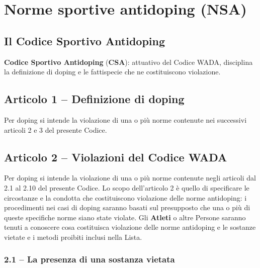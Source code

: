 \chapter{Norme sportive antidoping (NSA)}

\section{Il Codice Sportivo Antidoping}

\textbf{Codice Sportivo Antidoping} (\textbf{CSA}): attuativo del Codice WADA, disciplina la
definizione di doping e le fattispecie che ne costituiscono violazione.

\section{Articolo 1 -- Definizione di doping}

Per doping si intende la violazione di una o più norme contenute nei successivi articoli 2 e 3
del presente Codice.

\section{Articolo 2 -- Violazioni del Codice WADA}

Per doping si intende la violazione di una o più norme contenute negli articoli dal 2.1 al 2.10
del presente Codice. Lo scopo dell'articolo 2 è quello di specificare le circostanze e la
condotta che costituiscono violazione delle norme antidoping: i procedimenti nei casi di doping
saranno basati sul presupposto che una o più di queste specifiche norme siano state violate. Gli
\textbf{Atleti} o altre Persone saranno tenuti a conoscere cosa costituisca violazione delle
norme antidoping e le sostanze vietate e i metodi proibiti inclusi nella Lista.

\subsection{2.1 -- La presenza di una sostanza vietata}

